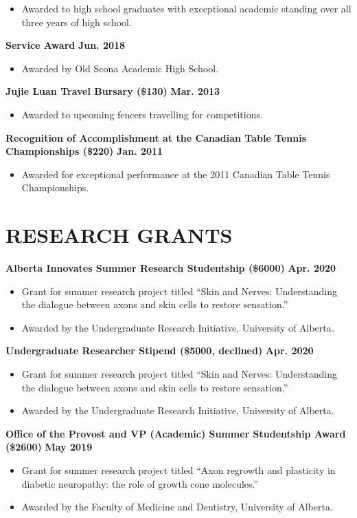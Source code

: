 \documentclass{article}
\begin{document}
        \begin{itemize}
            \item Awarded to high school graduates with exceptional academic standing over all three years of high school.
        \end{itemize}
    \textbf{Service Award} \hfill \textbf{Jun. 2018}
        \begin{itemize}
            \item Awarded by Old Scona Academic High School.
        \end{itemize}
    \textbf{Jujie Luan Travel Bursary (\$130)} \hfill \textbf{Mar. 2013}
        \begin{itemize}
            \item Awarded to upcoming fencers travelling for competitions.
        \end{itemize}
    \textbf{Recognition of Accomplishment at the Canadian Table Tennis Championships (\$220)} \hfill \textbf{Jan. 2011}
        \begin{itemize}
            \item Awarded for exceptional performance at the 2011 Canadian Table Tennis Championships.
        \end{itemize}

\section*{\textcolor{my_colour}{RESEARCH GRANTS}}
\vspace{-.25em} \hrulefill \vspace{.75em}

    \textbf{Alberta Innovates Summer Research Studentship (\$6000)} \hfill \textbf{Apr. 2020}
    \begin{itemize}
        \item Grant for summer research project titled ``Skin and Nerves: Understanding the dialogue between axons and skin cells to restore sensation.''
        \item Awarded by the Undergraduate Research Initiative, University of Alberta.
    \end{itemize}
    \textbf{Undergraduate Researcher Stipend (\$5000, declined)} \hfill \textbf{Apr. 2020}
    \begin{itemize}
        \item Grant for summer research project titled ``Skin and Nerves: Understanding the dialogue between axons and skin cells to restore sensation.''
        \item Awarded by the Undergraduate Research Initiative, University of Alberta.
    \end{itemize}
    \textbf{Office of the Provost and VP (Academic) Summer Studentship Award (\$2600)} \hfill \textbf{May 2019}
        \begin{itemize}
            \item Grant for summer research project titled ``Axon regrowth and plasticity in diabetic neuropathy: the role of growth cone molecules.''
            \item Awarded by the Faculty of Medicine and Dentistry, University of Alberta.
        \end{itemize}
\end{document}
